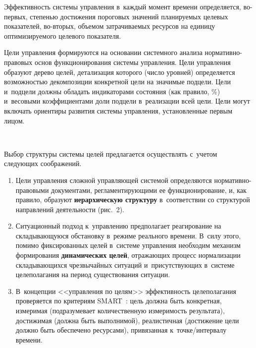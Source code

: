 \begin{multicols}{2}
    Эффективность сис\-те\-мы управ\-ле\-ния в~каждый момент времени 
определяется, во-пер\-вых, степенью достижения пороговых значений 
планируемых целевых показателей, во-вто\-рых, объемом затрачиваемых 
ресурсов на единицу оптимизируемого целевого показателя.
    
    Цели управления формируются на основании сис\-тем\-но\-го анализа  
нор\-ма\-тив\-но-пра\-во\-вых основ функционирования сис\-те\-мы управ\-ле\-ния. 
Цели управления образуют дерево целей, детализация которого (число 
уровней) определяется воз\-мож\-ностью декомпозиции конкретной цели на 
значимые подцели. Цели и~подцели должны обладать индикаторами 
состояния (как правило, \%) и~весовыми коэффициентами доли подцели 
в~реализации всей цели. Цели могут включать ориентиры развития сис\-те\-мы 
управления, установленные первым лицом.

\begin{figure*} %
\vspace*{1pt}
\begin{center}
\mbox{%
\epsfxsize=165.008mm
}
\end{center}
\vspace*{-9pt}
\end{figure*}
    
    Выбор структуры сис\-те\-мы целей предлагается осуществлять с~учетом 
следующих соображений.
    \begin{enumerate}[1.]
    \item Цели управления сложной управляющей сис\-те\-мой определяются 
нор\-ма\-тив\-но-пра\-во\-вы\-ми документа\-ми, регламентирующими ее 
функционирование, и, как правило, образуют \textbf{иерархическую 
структуру} в~соответствии со структурой направлений деятельности 
(рис.~2).
    \item Ситуационный подход к~управлению предполагает реагирование на 
складывающуюся обстановку в~режиме реального времени. В~силу этого, 
помимо фиксированных целей в~сис\-те\-ме управ\-ле\-ния необходим механизм 
формирования \textbf{динамических целей}, отражающих процесс 
нормализации складывающихся чрезвычайных ситуаций и~присутствующих 
в~сис\-те\-ме целеполагания на период существования ситуации.
    \item В~концепции <<управления по целям>> эффективность 
целеполагания проверяется по критериям SMART~\cite{9-zat}: цель должна 
быть конкретная, измеримая (подразумевает количественную измеримость 
результата), достижимая (должна быть выполнимой), реалистичная 
(достижение цели должно быть обеспечено ресурсами), привязанная  
к~точ\-ке/ин\-тер\-ва\-лу времени.
    \end{enumerate}
    

\end{multicols}
